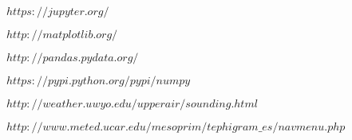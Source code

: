 \documentclass[12pt]{article}
\begin{document}
\begin{doublespace}
\newpage
\renewcommand{\refname}{\section{Referencias}}
\begin{thebibliography}{9}
 \textsc{$https://jupyter.org/$}

 \textsc{$http://matplotlib.org/$}

 \textsc{$http://pandas.pydata.org/$}

 \textsc{$https://pypi.python.org/pypi/numpy$}

 \textsc{$http://weather.uwyo.edu/upperair/sounding.html$}

 \textsc{$http://www.meted.ucar.edu/mesoprim/tephigram\_es/navmenu.php$}
\end{thebibliography}

\end{doublespace}
\end{document}
